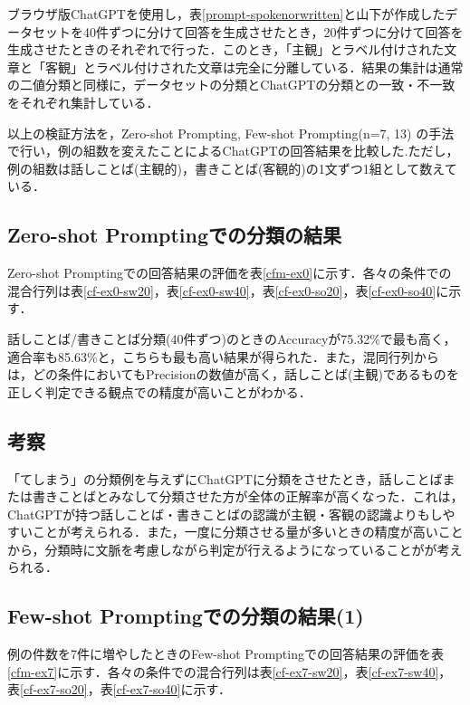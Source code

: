 ブラウザ版ChatGPTを使用し，表\ref{prompt-spokenorwritten}と山下が作成したデータセットを40件ずつに分けて回答を生成させたとき，20件ずつに分けて回答を生成させたときのそれぞれで行った．このとき，「主観」とラベル付けされた文章と「客観」とラベル付けされた文章は完全に分離している．結果の集計は通常の二値分類と同様に，データセットの分類とChatGPTの分類との一致・不一致をそれぞれ集計している．

以上の検証方法を，Zero-shot Prompting, Few-shot Prompting(n=7, 13) の手法で行い，例の組数を変えたことによるChatGPTの回答結果を比較した.ただし，例の組数は話しことば(主観的)，書きことば(客観的)の1文ずつ1組として数えている．

\subsection{Zero-shot Promptingでの分類の結果 \label{c6s1-1}}

Zero-shot Promptingでの回答結果の評価を表\ref{cfm-ex0}に示す．各々の条件での混合行列は表\ref{cf-ex0-sw20}，表\ref{cf-ex0-sw40}，表\ref{cf-ex0-so20}，表\ref{cf-ex0-so40}に示す．







話しことば/書きことば分類(40件ずつ)のときのAccuracyが75.32\%で最も高く，適合率も85.63\%と，こちらも最も高い結果が得られた．また，混同行列からは，どの条件においてもPrecisionの数値が高く，話しことば(主観)であるものを正しく判定できる観点での精度が高いことがわかる．

\subsection{考察}
「てしまう」の分類例を与えずにChatGPTに分類をさせたとき，話しことばまたは書きことばとみなして分類させた方が全体の正解率が高くなった．これは，ChatGPTが持つ話しことば・書きことばの認識が主観・客観の認識よりもしやすいことが考えられる．また，一度に分類させる量が多いときの精度が高いことから，分類時に文脈を考慮しながら判定が行えるようになっていることがが考えられる．

\subsection{Few-shot Promptingでの分類の結果(1) \label{c6s1-2}}
例の件数を7件に増やしたときのFew-shot Promptingでの回答結果の評価を表\ref{cfm-ex7}に示す．各々の条件での混合行列は表\ref{cf-ex7-sw20}，表\ref{cf-ex7-sw40}，表\ref{cf-ex7-so20}，表\ref{cf-ex7-so40}に示す．

